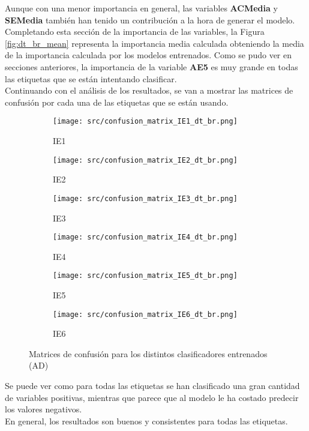 Aunque con una menor importancia en general, las variables \textbf{ACMedia} y \textbf{SEMedia} también han tenido un contribución a la hora de generar el modelo.\\
\linebreak
Completando esta sección de la importancia de las variables, la Figura \ref{fig:dt_br_mean} representa la importancia media calculada obteniendo la media de la importancia calculada por los modelos entrenados. Como se pudo ver en secciones anteriores, la importancia de la variable \textbf{AE5} es muy grande en todas las etiquetas que se están intentando clasificar.\\
\linebreak
Continuando con el análisis de los resultados, se van a mostrar las matrices de confusión por cada una de las etiquetas que se están usando.
\begin{figure}[H]
	\centering
	\begin{subfigure}[b]{0.3\textwidth}
		\centering
		\texttt{[image: src/confusion\_matrix\_IE1\_dt\_br.png]}
		\caption{IE1}
	\end{subfigure}
	\hfill
	\begin{subfigure}[b]{0.3\textwidth}
		\centering
		\texttt{[image: src/confusion\_matrix\_IE2\_dt\_br.png]}
		\caption{IE2}
	\end{subfigure}
	\hfill
	\begin{subfigure}[b]{0.3\textwidth}
		\centering
		\texttt{[image: src/confusion\_matrix\_IE3\_dt\_br.png]}
		\caption{IE3}
	\end{subfigure}
	\hfill
	\begin{subfigure}[b]{0.3\textwidth}
		\centering
		\texttt{[image: src/confusion\_matrix\_IE4\_dt\_br.png]}
		\caption{IE4}
	\end{subfigure}
	\hfill
	\begin{subfigure}[b]{0.3\textwidth}
		\centering
		\texttt{[image: src/confusion\_matrix\_IE5\_dt\_br.png]}
		\caption{IE5}
	\end{subfigure}
	\hfill
	\begin{subfigure}[b]{0.3\textwidth}
		\centering
		\texttt{[image: src/confusion\_matrix\_IE6\_dt\_br.png]}
		\caption{IE6}
	\end{subfigure}
	\caption{Matrices de confusión para los distintos clasificadores entrenados (AD)}
	\label{fig:ml_conf_matrix_dt}
\end{figure}
Se puede ver como para todas las etiquetas se han clasificado una gran cantidad de variables positivas, mientras que parece que al modelo le ha costado predecir los valores negativos. \\
En general, los resultados son buenos y consistentes para todas las etiquetas.
\clearpage
